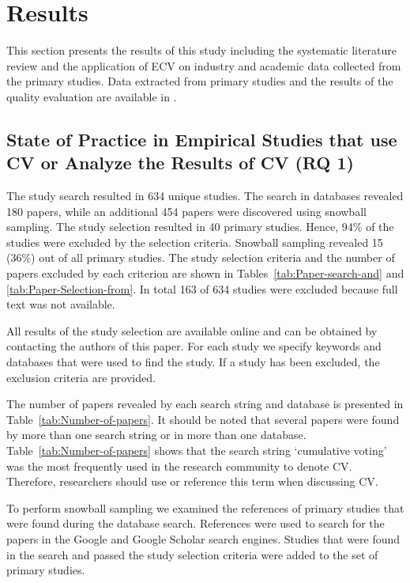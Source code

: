 \section{\label{results}Results}
This section presents the results of this study including the systematic literature review and the application of ECV on industry and academic data collected from the primary studies.
Data extracted from primary studies and the results of the quality evaluation are available in \cite{Rinkevics2011a}.

\subsection{State of Practice in Empirical Studies that use CV or Analyze the Results of CV (RQ 1)\label{rq1}}
The study search resulted in 634 unique studies. The search in databases revealed 180 papers, while an additional 454 papers were discovered using snowball sampling.
The study selection resulted in 40 primary studies. Hence, 94\% of the studies were excluded by the selection criteria.
Snowball sampling revealed 15 (36\%) out of all primary studies.
The study selection criteria and the number of papers excluded by each criterion are shown in Tables~\ref{tab:Paper-search-and} and \ref{tab:Paper-Selection-from}.
In total 163 of 634 studies were excluded because full text was not available.

All results of the study selection are available online and can be obtained by contacting the authors of this paper.
For each study we specify keywords and databases that were used to find the study.
If a study has been excluded, the exclusion criteria are provided.

The number of papers revealed by each search string and database is
presented in Table~\ref{tab:Number-of-papers}. It should be noted
that several papers were found by more than one search string or in
more than one database. Table~\ref{tab:Number-of-papers} shows that
the search string `cumulative voting' was the most frequently used
in the research community to denote CV. Therefore, researchers should use 
or reference this term when discussing CV.

To perform snowball sampling we examined the references of primary studies that were found during the database search.
References were used to search for the papers in the Google and Google Scholar search engines.
Studies that were found in the search and passed the study selection criteria were added to the set of primary studies.

